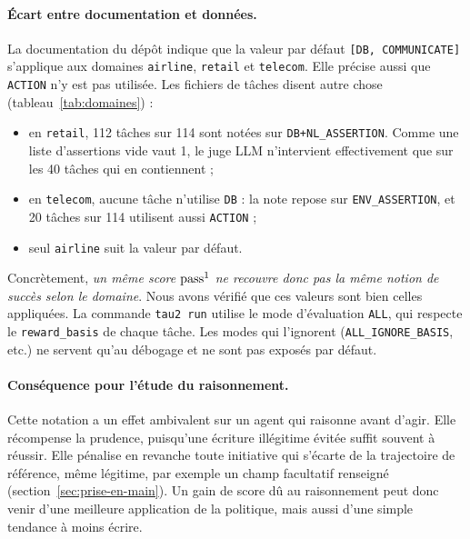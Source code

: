 \paragraph{Écart entre documentation et données.} La documentation du dépôt indique que la valeur par défaut \texttt{[DB, COMMUNICATE]} s'applique aux domaines \texttt{airline}, \texttt{retail} et \texttt{telecom}. Elle précise aussi que \texttt{ACTION} n'y est pas utilisée. Les fichiers de tâches disent autre chose (tableau~\ref{tab:domaines}) :
\begin{itemize}[nosep]
  \item en \texttt{retail}, 112 tâches sur 114 sont notées sur \texttt{DB+NL\_ASSERTION}. Comme une liste d'assertions vide vaut 1, le juge LLM n'intervient effectivement que sur les 40 tâches qui en contiennent ;
  \item en \texttt{telecom}, aucune tâche n'utilise \texttt{DB} : la note repose sur \texttt{ENV\_ASSERTION}, et 20 tâches sur 114 utilisent aussi \texttt{ACTION} ;
  \item seul \texttt{airline} suit la valeur par défaut.
\end{itemize}
Concrètement, \emph{un même score $\text{pass}^{1}$ ne recouvre donc pas la même notion de succès selon le domaine}.
Nous avons vérifié que ces valeurs sont bien celles appliquées. La commande \texttt{tau2 run} utilise le mode d'évaluation \texttt{ALL}, qui respecte le \texttt{reward\_basis} de chaque tâche. Les modes qui l'ignorent (\texttt{ALL\_IGNORE\_BASIS}, etc.) ne servent qu'au débogage et ne sont pas exposés par défaut.

\paragraph{Conséquence pour l'étude du raisonnement.} Cette notation a un effet ambivalent sur un agent qui raisonne avant d'agir. Elle récompense la prudence, puisqu'une écriture illégitime évitée suffit souvent à réussir. Elle pénalise en revanche toute initiative qui s'écarte de la trajectoire de référence, même légitime, par exemple un champ facultatif renseigné (section~\ref{sec:prise-en-main}). Un gain de score dû au raisonnement peut donc venir d'une meilleure application de la politique, mais aussi d'une simple tendance à moins écrire.
